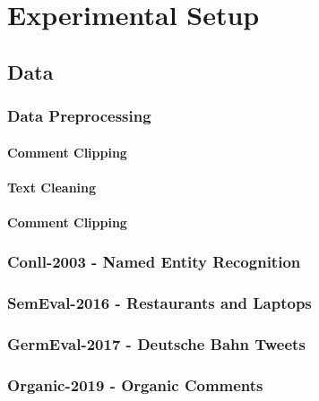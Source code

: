 \chapter{Experimental Setup}
\label{ch:setup}

\section{Data}
\subsection{Data Preprocessing}

\subsubsection{Comment Clipping}
\subsubsection{Text Cleaning}
\subsubsection{Comment Clipping}



\subsection{Conll-2003 - Named Entity Recognition}
\subsection{SemEval-2016 - Restaurants and Laptops}
\subsection{GermEval-2017 - Deutsche Bahn Tweets}
\subsection{Organic-2019 - Organic Comments}